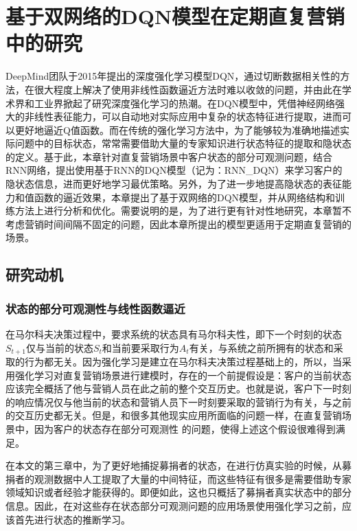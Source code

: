 
\chapter{基于双网络的DQN模型在定期直复营销中的研究}

DeepMind团队于2015年提出的深度强化学习模型DQN，通过切断数据相关性的方法，在很大程度上解决了使用非线性函数逼近方法时难以收敛的问题，并由此在学术界和工业界掀起了研究深度强化学习的热潮。在DQN模型中，凭借神经网络强大的非线性表征能力，可以自动地对实际应用中复杂的状态特征进行提取，进而可以更好地逼近Q值函数。而在传统的强化学习方法中，为了能够较为准确地描述实际问题中的目标状态，常常需要借助大量的专家知识进行状态特征的提取和隐状态的定义。基于此，本章针对直复营销场景中客户状态的部分可观测问题，结合RNN网络，提出使用基于RNN的DQN模型（记为：RNN_DQN）来学习客户的隐状态信息，进而更好地学习最优策略。另外，为了进一步地提高隐状态的表征能力和值函数的逼近效果，本章提出了基于双网络的DQN模型，并从网络结构和训练方法上进行分析和优化。需要说明的是，为了进行更有针对性地研究，本章暂不考虑营销时间间隔不固定的问题，因此本章所提出的模型更适用于定期直复营销的场景。

\section{研究动机}
\subsection{状态的部分可观测性与线性函数逼近}
在马尔科夫决策过程中，要求系统的状态具有马尔科夫性，即下一个时刻的状态$S_{t+1}$仅与当前的状态$S_{t}$和当前要采取行为$A_{t}$有关，与系统之前所拥有的状态和采取的行为都无关\citep{2016面向强化学习的模型学习算法研究}。因为强化学习是建立在马尔科夫决策过程基础上的，所以，当采用强化学习对直复营销场景进行建模时，存在的一个前提假设是：客户的当前状态应该完全概括了他与营销人员在此之前的整个交互历史。也就是说，客户下一时刻的响应情况仅与他当前的状态和营销人员下一时刻要采取的营销行为有关，与之前的交互历史都无关。但是，和很多其他现实应用所面临的问题一样，在直复营销场景中，因为客户的状态存在部分可观测性
的问题，使得上述这个假设很难得到满足。

在本文的第三章中，为了更好地捕捉募捐者的状态，在进行仿真实验的时候，从募捐者的观测数据中人工提取了大量的中间特征，而这些特征有很多是需要借助专家领域知识或者经验才能获得的。即便如此，这也只概括了募捐者真实状态中的部分信息。因此，在对这些存在状态部分可观测问题的应用场景使用强化学习之前，应该首先进行状态的推断学习。

